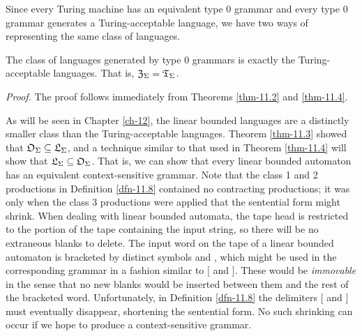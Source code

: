 Since every Turing machine has an equivalent type 0 grammar and every type 0
grammar generates a Turing-acceptable language, we have two ways of representing
the same class of languages.

\begin{cor}\label{cor-11.1}
The class of languages generated by type 0 grammars is exactly the
Turing-acceptable languages. That is, $\mathfrak{Z}_\Sigma=\mathfrak{T}_\Sigma$.

\emph{Proof.} The proof follows immediately from Theorems \ref{thm-11.2} and \ref{thm-11.4}.
\end{cor}

As will be seen in Chapter \ref{ch-12}, the linear bounded languages are a distinctly
smaller class than the Turing-acceptable languages. Theorem \ref{thm-11.3} showed that
$\mathfrak{O}_\Sigma\subseteq\mathfrak{L}_\Sigma$, and a technique similar to that used in Theorem \ref{thm-11.4} will
show that $\mathfrak{L}_\Sigma\subseteq\mathfrak{O}_\Sigma$. That is, we can show that every linear bounded
automaton has an equivalent context-sensitive grammar. Note that the class 1 and
2 productions in Definition \ref{dfn-11.8} contained no contracting productions; it was
only when the class 3 productions were applied that the sentential form might
shrink. When dealing with linear bounded automata, the tape head is restricted
to the portion of the tape containing the input string, so there will be no
extraneous blanks to delete. The input word on the tape of a linear bounded
automaton is bracketed by distinct symbols \< and \>, which might be used in the
corresponding grammar in a fashion similar to $[$ and $]$. These would be
\emph{immovable} in the sense that no new blanks would be inserted between them
and the rest of the bracketed word. Unfortunately, in Definition \ref{dfn-11.8} the
delimiters $[$ and $]$ must eventually disappear, shortening the sentential
form. No such shrinking can occur if we hope to produce a context-sensitive
grammar.

